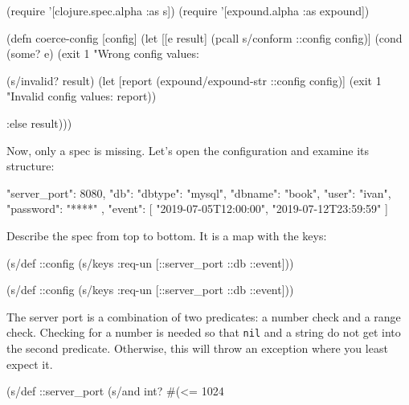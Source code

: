 \else

\begin{clojure}
(require '[clojure.spec.alpha :as s])
(require '[expound.alpha :as expound])

(defn coerce-config [config]
  (let [[e result] (pcall s/conform ::config config)]
    (cond
      (some? e)
      (exit 1 "Wrong config values: %

      (s/invalid? result)
      (let [report (expound/expound-str ::config config)]
        (exit 1 "Invalid config values: %
              \newline report))

      :else result)))
\end{clojure}

\fi

Now, only a spec is missing. Let's open the configuration and examine its structure:


\begin{json}
{
    "server_port": 8080,
    "db": {
        "dbtype":   "mysql",
        "dbname":   "book",
        "user":     "ivan",
        "password": "****"
    },
    "event": [
        "2019-07-05T12:00:00",
        "2019-07-12T23:59:59"
    ]
}
\end{json}

Describe the spec from top to bottom. It is a map with the keys:

\ifnarrow

\begin{clojure}
(s/def ::config
  (s/keys :req-un [::server_port
                   ::db ::event]))
\end{clojure}

\else

\begin{clojure}
(s/def ::config
  (s/keys :req-un [::server_port ::db ::event]))
\end{clojure}

\fi


The server port is a combination of two predicates: a number check and a range check. Checking for a number is needed so that \verb|nil| and a string do not get into the second predicate. Otherwise, this will throw an exception where you least expect it.

\begin{clojure}
(s/def ::server_port
  (s/and int? #(<= 1024 %
\end{clojure}

